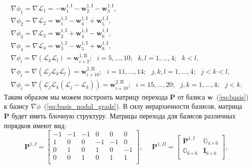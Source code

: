 \documentclass[a4paper,14pt]{article}
\begin{document}
\begin{equation}
	\begin{matrix}
		\displaystyle
		\nabla \phi_{1} = \nabla \mathcal{L}_1 = - \mathbf{w}_{1}^{1,\mathrm{I}} - \mathbf{w}_{2}^{1,\mathrm{I}} - \mathbf{w}_{3}^{1,\mathrm{I}} ,\\
		\displaystyle
		\nabla \phi_{2} = \nabla \mathcal{L}_2 = \mathbf{w}_{1}^{1,\mathrm{I}} - \mathbf{w}_{4}^{1,\mathrm{I}} + \mathbf{w}_{5}^{1,\mathrm{I}} ,\\
		\displaystyle
		\nabla \phi_{3} = \nabla \mathcal{L}_3 = \mathbf{w}_{2}^{1,\mathrm{I}} + \mathbf{w}_{4}^{1,\mathrm{I}} - \mathbf{w}_{6}^{1,\mathrm{I}} ,\\
		\displaystyle
		\nabla \phi_{4} = \nabla \mathcal{L}_4 = \mathbf{w}_{3}^{1,\mathrm{I}} - \mathbf{w}_{5}^{1,\mathrm{I}} + \mathbf{w}_{6}^{1,\mathrm{I}} ,\\
		\displaystyle
		\nabla \phi_{i} = \nabla ( \mathcal{L}_k \mathcal{L}_l ) = \mathbf{w}_{i+2}^{1,\mathrm{II}} ;
		\scriptstyle
		\text{~~} i = 5, ..., 10 ; \text{~~} k, l = 1, ..., 4 ; \text{~~} k < l ,\\
		\displaystyle
		\nabla \phi_{i} = \nabla ( \mathcal{L}_j \mathcal{L}_k \mathcal{L}_l ) = \mathbf{w}_{i+10}^{2,\mathrm{II}} ;
		\scriptstyle
		\text{~~} i = 11, ..., 14 ; \text{~~} j, k, l = 1, ..., 4 ; \text{~~} j < k < l ,\\
		\displaystyle
		\nabla \phi_{i} = \nabla ( \mathcal{L}_j \mathcal{L}_k ( \mathcal{L}_j - \mathcal{L}_k ) ) = \mathbf{w}_{i+10}^{2,\mathrm{II}} ;
		\scriptstyle
		\text{~~} i = 15, ..., 20 ; \text{~~} j, k = 1, ..., 4 ; \text{~~} j < k .
	\end{matrix}
	\label{eq:basis_nodal_grads}
\end{equation}
Таким образом мы можем построить матрицу перехода $\mathbf{P}$ от базиса $\mathbf{w}$~(\ref{eq:basis}) к базису $\nabla \phi$~(\ref{eq:basis_nodal_grads}). В силу иерархичности базисов, матрица $\mathbf{P}$ будет иметь блочную структуру. Матрицы перехода для базисов различных порядков имеют вид:
\begin{equation*}
	\mathbf{P}^{1,I} = \left[
	\begin{matrix}
		-1 & -1 & -1 &  0 &  0 &  0 \\
		 1 &  0 &  0 & -1 & -1 &  0 \\
		 0 &  1 &  0 &  1 &  0 & -1 \\
		 0 &  0 &  1 &  0 &  1 &  1 \\
	\end{matrix}
	\right],
\text{~~~~}
	\mathbf{P}^{1,II} = \left[
	\begin{matrix}
		\mathbf{P}^{1,I} & \mathbb{O}_{4 \times 6} \\
		\mathbb{O}_{6 \times 6} & \mathbf{I}_{6 \times 6} \\
	\end{matrix}
	\right],
\end{equation*}
\end{document}
